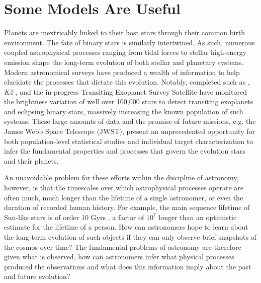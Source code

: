 
\section{Some Models Are Useful}

Planets are inextricably linked to their host stars through their common birth environment. The fate of binary stars is similarly intertwined.  As such, numerous coupled astrophysical processes ranging from tidal forces \citep{Zahn1989,Barnes2017} to stellar high-energy emission \citep{Airapetian2019} shape the long-term evolution of both stellar and planetary systems. Modern astronomical surveys have produced a wealth of information to help elucidate the processes that dictate this evolution. Notably, completed such as \kepler \citep{Borucki2003,Borucki2010}, \textit{K2} \citep{Howell2014}, and the in-progress Transiting Exoplanet Survey Satellite \citep[TESS, ][]{Ricker2014} have monitored the brightness variation of well over 100,000 stars to detect transiting exoplanets and eclipsing binary stars, massively increasing the known population of such systems.  These large amounts of data and the promise of future missions, e.g. the James Webb Space Telescope (JWST), present an unprecedented opportunity for both population-level statistical studies and individual target characterization to infer the fundamental properties and processes that govern the evolution stars and their planets.

An unavoidable problem for these efforts within the discipline of astronomy, however, is that the timescales over which astrophysical processes operate are often much, much longer than the lifetime of a single astronomer, or even the duration of recorded human history. For example, the main sequence lifetime of Sun-like stars is of order 10 Gyrs \citep{Baraffe2015}, a factor of $10^7$ longer than an optimistic estimate for the lifetime of a person. How can astronomers hope to learn about the long-term evolution of such objects if they can only observe brief snapshots of the cosmos over time? The fundamental problems of astronomy are therefore given what is observed, how can astronomers infer what physical processes produced the observations and what does this information imply about the past and future evolution? 

